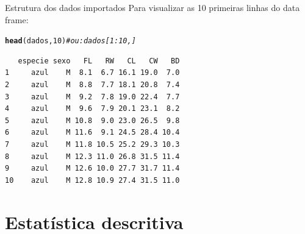 \documentclass[10pt]{beamer}\usepackage[]{graphicx}\usepackage[]{color}
\makeatletter
\newcommand{\hlnum}[1]{\textcolor[rgb]{0.686,0.059,0.569}{#1}}%
\newcommand{\hlcom}[1]{\textcolor[rgb]{0.678,0.584,0.686}{\textit{#1}}}%
\newcommand{\hlstd}[1]{\textcolor[rgb]{0.345,0.345,0.345}{#1}}%
\newcommand{\hlkwd}[1]{\textcolor[rgb]{0.737,0.353,0.396}{\textbf{#1}}}%
\newenvironment{kframe}{%
 \def\at@end@of@kframe{}%
 \ifinner\ifhmode%
  \def\at@end@of@kframe{\end{minipage}}%
  \begin{minipage}{\columnwidth}%
 \fi\fi%
 \def\FrameCommand##1{\hskip\@totalleftmargin \hskip-\fboxsep
 \colorbox{shadecolor}{##1}\hskip-\fboxsep
     \hskip-\linewidth \hskip-\@totalleftmargin \hskip\columnwidth}%
 \MakeFramed {\advance\hsize-\width
   \@totalleftmargin\z@ \linewidth\hsize
   \@setminipage}}%
 {\par\unskip\endMakeFramed%
 \at@end@of@kframe}
\newenvironment{knitrout}{}{} %
\makeatother
\begin{document}
\begin{frame}[fragile]{Estrutura dos dados importados}
Para visualizar as 10 primeiras linhas do data frame:
\begin{knitrout}\small
{}\color{fgcolor}\begin{kframe}
\begin{alltt}
\hlkwd{head}\hlstd{(dados,} \hlnum{10}\hlstd{)} \hlcom{# ou: dados[1:10,]}
\end{alltt}
\begin{verbatim}
   especie sexo   FL   RW   CL   CW   BD
1     azul    M  8.1  6.7 16.1 19.0  7.0
2     azul    M  8.8  7.7 18.1 20.8  7.4
3     azul    M  9.2  7.8 19.0 22.4  7.7
4     azul    M  9.6  7.9 20.1 23.1  8.2
5     azul    M 10.8  9.0 23.0 26.5  9.8
6     azul    M 11.6  9.1 24.5 28.4 10.4
7     azul    M 11.8 10.5 25.2 29.3 10.3
8     azul    M 12.3 11.0 26.8 31.5 11.4
9     azul    M 12.6 10.0 27.7 31.7 11.4
10    azul    M 12.8 10.9 27.4 31.5 11.0
\end{verbatim}
\end{kframe}
\end{knitrout}
\end{frame}


\section{Estatística descritiva}
\end{document}
